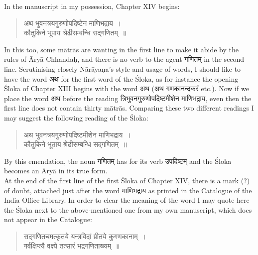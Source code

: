 \documentclass[11pt, openany]{book}
\begin{document}
\vspace{-2mm}
 In the manuscript in my possession, Chapter XIV 
begins:\textemdash\ 
\begin{quote}
    \qt 
    अथ भुवनत्रयगुरुणोपदिष्टेन माणिभद्राय~। \\
 कौतुकिने भूपाय श्रेढीसम्बन्धि सद्गणितम्~॥~
\end{quote}
\newpage%

 In this too, some mātrās are wanting in the first line to 
make it abide by the rules of Āryā Chhandaḥ, and there is 
no verb to the agent गणितम् in the second line. Scrutinising 
closely Nārāyaṇa's style and usage of words, I should like
to have the word अथ for the first word of the Śloka, as for 
instance the opening Śloka of Chapter XIII begins with the 
word अथ ({\qt अथ गणकानन्दकरं} etc.). Now if we place the word अथ 
before the reading त्रिभुवनगुरुणोपदिष्टमीशेन माणिभद्राय, even then the
first line does not contain thirty mātrās. Comparing these 
two different readings I may suggest the following reading of 
the Śloka: 
\begin{quote}
    \qt 
     अथ भुवनत्रयगुरुणोपदिष्टमीशेन माणिभद्राय~। \\
 कौतुकिने भूताय श्रेढीसम्बन्धि सद्गणितम्~॥~
\end{quote}

 By this emendation, the noun गणितम् has for its verb 
उपदिष्टम् and the Śloka becomes an Āryā in its true form.\\

\vspace{-2mm}
 At the end of the first line of the first Śloka of Chapter 
XIV, there is a mark (?) of doubt, attached just after the 
word माणिभद्राय as printed in the Catalogue of the India Office 
Library. In order to clear the meaning of the word I may 
quote here the Śloka next to the above-mentioned one from my 
own manuscript, which does not appear in the Catalogue: 
\begin{quote}
    \qt 
     सद्गणितचमत्कृतये यन्त्रविदां प्रीतये कुगणकानाम्~। \\
 गर्वक्षिप्त्यै वक्ष्ये तत्सारं भद्रगणिताख्यम्~॥~
\end{quote}
\end{document}
